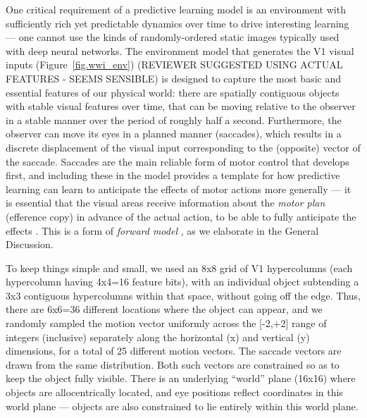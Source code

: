 \documentclass[11pt,twoside]{article}
\newif\myifpdf
\begin{document}
One critical requirement of a predictive learning model is an environment with sufficiently rich yet predictable dynamics over time to drive interesting learning --- one cannot use the kinds of randomly-ordered static images typically used with deep neural networks. The environment model that generates the V1 visual inputs (Figure~\ref{fig.wwi_env}) (REVIEWER SUGGESTED USING ACTUAL FEATURES - SEEMS SENSIBLE) is designed to capture the most basic and essential features of our physical world: there are spatially contiguous objects with stable visual features over time, that can be moving relative to the observer in a stable manner over the period of roughly half a second.  Furthermore, the observer can move its eyes in a planned manner (saccades), which results in a discrete displacement of the visual input corresponding to the (opposite) vector of the saccade.  Saccades are the main reliable form of motor control that develops first, and including these in the model provides a template for how predictive learning can learn to anticipate the effects of motor actions more generally --- it is essential that the visual areas receive information about the {\em motor plan} (efference copy) in advance of the actual action, to be able to fully anticipate the effects \cite{vonHolst54,Wurtz08}.  This is a form of {\em forward model} \cite{KawatoFurukawaSuzuki87,JordanRumelhart92,MiallWolpert96}, as we elaborate in the General Discussion.

To keep things simple and small, we used an 8x8 grid of V1 hypercolumns (each hypercolumn having 4x4=16 feature bits), with an individual object subtending a 3x3 contiguous hypercolumns within that space, without going off the edge.  Thus, there are 6x6=36 different locations where the object can appear, and we randomly sampled the motion vector uniformly across the [-2,+2] range of integers (inclusive) separately along the horizontal (x) and vertical (y) dimensions, for a total of 25 different motion vectors.  The saccade vectors are drawn from the same distribution.  Both such vectors are constrained so as to keep the object fully visible.  There is an underlying ``world'' plane (16x16) where objects are allocentrically located, and eye positions reflect coordinates in this world plane --- objects are also constrained to lie entirely within this world plane.
\end{document}
